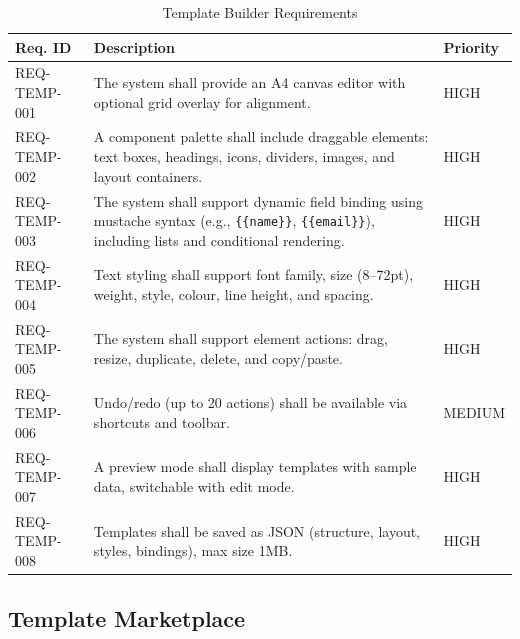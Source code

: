 \documentclass[12pt, a4paper, oneside]{report}
\begin{document}
\begin{table}[H]
\centering
\caption{Template Builder Requirements}
\label{tab:req_builder}
\renewcommand{\arraystretch}{1.2}
\small
\begin{tabularx}{\textwidth}{|p{3cm}|X|p{2cm}|}
\hline
\textbf{Req. ID} & \textbf{Description} & \textbf{Priority} \\
\hline
REQ-TEMP-001 & The system shall provide an A4 canvas editor with optional grid overlay for alignment. & HIGH \\
\hline
REQ-TEMP-002 & A component palette shall include draggable elements: text boxes, headings, icons, dividers, images, and layout containers. & HIGH \\
\hline
REQ-TEMP-003 & The system shall support dynamic field binding using mustache syntax (e.g., \texttt{\{\{name\}\}}, \texttt{\{\{email\}\}}), including lists and conditional rendering. & HIGH \\
\hline
REQ-TEMP-004 & Text styling shall support font family, size (8--72pt), weight, style, colour, line height, and spacing. & HIGH \\
\hline
REQ-TEMP-005 & The system shall support element actions: drag, resize, duplicate, delete, and copy/paste. & HIGH \\
\hline
REQ-TEMP-006 & Undo/redo (up to 20 actions) shall be available via shortcuts and toolbar. & MEDIUM \\
\hline
REQ-TEMP-007 & A preview mode shall display templates with sample data, switchable with edit mode. & HIGH \\
\hline
REQ-TEMP-008 & Templates shall be saved as JSON (structure, layout, styles, bindings), max size 1MB. & HIGH \\
\hline
\end{tabularx}
\end{table}

\subsection{Template Marketplace}
\end{document}
